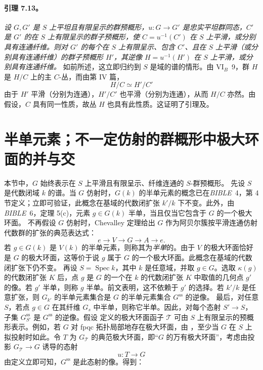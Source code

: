\paragraph{\textbf{引理 7.13。}}
\emph{设 \(G,G'\) 是 \(S\) 上平坦且有限呈示的群预概形，\(u:G\to G'\) 是忠实平坦群同态，\(C'\) 是 \(G'\) 的在 \(S\) 上有限呈示的群子预概形，使 \(C=u^{-1}(C')\) 在 \(S\) 上平滑，或分别具有连通纤维。则对 \(G'\) 的每个在 \(S\) 上有限呈示、包含 \(C'\)、且在 \(S\) 上平滑（或分别具有连通纤维）的群子预概形 \(H'\)，其逆像 \(H=u^{-1}(H')\) 在 \(S\) 上平滑，或分别具有连通纤维。}
如前所述，这立即归约到 \(S\) 是域的谱的情形。由 VI\(_B\)~9，群 \(H\) 是 \(H/C\) 上的主 \(C\)-丛，而由第 IV 篇，
\[
  H/C\simeq H'/C'
\]
由于 \(H'\) 平滑（分别为连通），\(H'/C'\) 也平滑（分别为连通），从而 \(H/C\) 亦然。由假设，\(C\) 具有同一性质，故丛 \(H\) 也具有此性质。这证明了引理及。
\section{半单元素；不一定仿射的群概形中极大环面的并与交}
本节中，\(G\) 始终表示在 \(S\) 上平滑且有限呈示、纤维连通的 \(S\)-群预概形。
先设 \(S\) 是代数闭域 \(k\) 的谱。当 \(G\) 仿射时，\(G(k)\) 的半单元素的概念已在\emph{BIBLE}~4，第 4 节定义；立即可验证，此概念在基域的代数闭扩张 \(k'/k\) 下不变。此外，由\emph{BIBLE}~6，定理 5(c)，元素 \(g\in G(k)\) 半单，当且仅当它包含于 \(G\) 的一个极大环面。
不再假设 \(G\) 仿射时，Chevalley 定理给出 \(G\) 作为阿贝尔簇按平滑连通仿射代数群的扩张的典范表达式：
\begin{equation}
\tag{*}\label{sga3:xii:lemma:7-13:equation:star}
  e\longrightarrow V\longrightarrow G\longrightarrow A
  \longrightarrow e.
\end{equation}
若 \(g\in G(k)\) 是 \(V(k)\) 的半单元素，则称其为\emph{半单}的。由于 \(V\) 的极大环面恰好是 \(G\) 的极大环面，这等价于说 \(g\) 属于 \(G\) 的一个极大环面。此概念在基域的代数闭扩张下仍不变。
再设 \(S=\operatorname{Spec}k\)，其中 \(k\) 是任意域，并取 \(g\in G\)。选取 \(\kappa(g)\) 的代数闭扩张 \(K\) 后，点 \(g\) 是 \(G\) 的一个在 \(k\) 的代数闭扩张 \(K\) 中取值的几何点 \(g'\) 的像。若 \(g'\) 半单，则称 \(g\) 半单。前文表明，这不依赖于 \(g'\) 的选择。若 \(k'/k\) 是任意扩张，则 \(G_{k'}\) 的半单元素集合是 \(G\) 的半单元素集合 \(G^{\mathrm{ss}}\) 的逆像。
最后，对任意 \(S\)，若点 \(g\in G\) 在其纤维 \(G_s\) 中半单，则称它半单。因此，对每个态射 \(S'\to S\)，子集 \(G^{\mathrm{ss}}_{S'}\) 是 \(G^{\mathrm{ss}}\) 的逆像。假设  定义的极大环面函子 \(\mathcal T\) 可由 \(S\) 上有限呈示的预概形表示。例如，若 \(G\) 对 fpqc 拓扑局部地存在极大环面，由 ，至少当 \(G\) 在 \(S\) 上拟投射时如此。令 \(T\) 为 \(G_{\mathcal T}\) 的典范极大环面，即“\(G\) 的万有极大环面”，考虑由投影 \(G_{\mathcal T}\to G\) 诱导的态射
\[
  u:T\longrightarrow G
\]
由定义立即可知，\(G^{\mathrm{ss}}\) 是此态射的像。得到：
